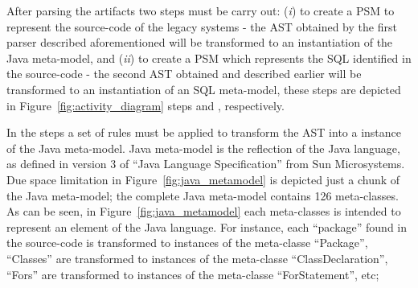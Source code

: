 \documentclass[a4paper,twoside]{article}
\newcommand*\circled[1]{\tikz[baseline=(char.base)]{
  \node[shape=circle,draw, inner sep=0.1pt] (char) {#1};}
}
\begin{document}
After parsing the artifacts two steps must be carry out: (\textit{i}) to create a PSM to represent the source-code of the legacy systems - the AST obtained by the first parser described aforementioned will be transformed to an instantiation of the Java meta-model, and (\textit{ii}) to create a PSM which represents the SQL identified in the source-code - the second AST obtained and described earlier will be transformed to an instantiation of an SQL meta-model, these steps are depicted in Figure~\ref{fig:activity_diagram} steps \circled{\textbf{C}} and \circled{\textbf{D}}, respectively.




In the steps \circled{\textbf{C}} a set of rules must be applied to transform the AST into a instance of the Java meta-model. 
 Java meta-model is the reflection of the Java language, as defined in version 3 of ``Java Language Specification'' from Sun Microsystems. Due space limitation in Figure~\ref{fig:java_metamodel} is depicted just a chunk of the Java meta-model; the complete Java meta-model contains 126 meta-classes. As can be seen, in Figure~\ref{fig:java_metamodel} each meta-classes is intended to represent an element of the Java language. For instance, each ``package'' found in the source-code is transformed to instances of the meta-classe ``Package'', ``Classes'' are transformed to instances of the meta-classe ``ClassDeclaration'', ``Fors'' are transformed to instances of the meta-classe ``ForStatement'', etc;
\end{document}
